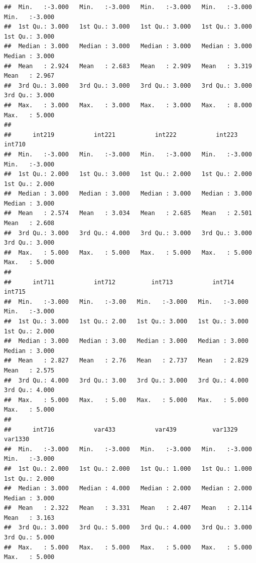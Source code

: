 \documentclass[
]{book}
\begin{document}
\begin{verbatim}
##  Min.   :-3.000   Min.   :-3.000   Min.   :-3.000   Min.   :-3.000   Min.   :-3.000  
##  1st Qu.: 3.000   1st Qu.: 3.000   1st Qu.: 3.000   1st Qu.: 3.000   1st Qu.: 3.000  
##  Median : 3.000   Median : 3.000   Median : 3.000   Median : 3.000   Median : 3.000  
##  Mean   : 2.924   Mean   : 2.683   Mean   : 2.909   Mean   : 3.319   Mean   : 2.967  
##  3rd Qu.: 3.000   3rd Qu.: 3.000   3rd Qu.: 3.000   3rd Qu.: 3.000   3rd Qu.: 3.000  
##  Max.   : 3.000   Max.   : 3.000   Max.   : 3.000   Max.   : 8.000   Max.   : 5.000  
##                                                                                      
##      int219           int221           int222           int223           int710      
##  Min.   :-3.000   Min.   :-3.000   Min.   :-3.000   Min.   :-3.000   Min.   :-3.000  
##  1st Qu.: 2.000   1st Qu.: 3.000   1st Qu.: 2.000   1st Qu.: 2.000   1st Qu.: 2.000  
##  Median : 3.000   Median : 3.000   Median : 3.000   Median : 3.000   Median : 3.000  
##  Mean   : 2.574   Mean   : 3.034   Mean   : 2.685   Mean   : 2.501   Mean   : 2.608  
##  3rd Qu.: 3.000   3rd Qu.: 4.000   3rd Qu.: 3.000   3rd Qu.: 3.000   3rd Qu.: 3.000  
##  Max.   : 5.000   Max.   : 5.000   Max.   : 5.000   Max.   : 5.000   Max.   : 5.000  
##                                                                                      
##      int711           int712          int713           int714           int715      
##  Min.   :-3.000   Min.   :-3.00   Min.   :-3.000   Min.   :-3.000   Min.   :-3.000  
##  1st Qu.: 3.000   1st Qu.: 2.00   1st Qu.: 3.000   1st Qu.: 3.000   1st Qu.: 2.000  
##  Median : 3.000   Median : 3.00   Median : 3.000   Median : 3.000   Median : 3.000  
##  Mean   : 2.827   Mean   : 2.76   Mean   : 2.737   Mean   : 2.829   Mean   : 2.575  
##  3rd Qu.: 4.000   3rd Qu.: 3.00   3rd Qu.: 3.000   3rd Qu.: 4.000   3rd Qu.: 4.000  
##  Max.   : 5.000   Max.   : 5.00   Max.   : 5.000   Max.   : 5.000   Max.   : 5.000  
##                                                                                     
##      int716           var433           var439          var1329          var1330      
##  Min.   :-3.000   Min.   :-3.000   Min.   :-3.000   Min.   :-3.000   Min.   :-3.000  
##  1st Qu.: 2.000   1st Qu.: 2.000   1st Qu.: 1.000   1st Qu.: 1.000   1st Qu.: 2.000  
##  Median : 3.000   Median : 4.000   Median : 2.000   Median : 2.000   Median : 3.000  
##  Mean   : 2.322   Mean   : 3.331   Mean   : 2.407   Mean   : 2.114   Mean   : 3.163  
##  3rd Qu.: 3.000   3rd Qu.: 5.000   3rd Qu.: 4.000   3rd Qu.: 3.000   3rd Qu.: 5.000  
##  Max.   : 5.000   Max.   : 5.000   Max.   : 5.000   Max.   : 5.000   Max.   : 5.000  

\end{verbatim}
\end{document}

